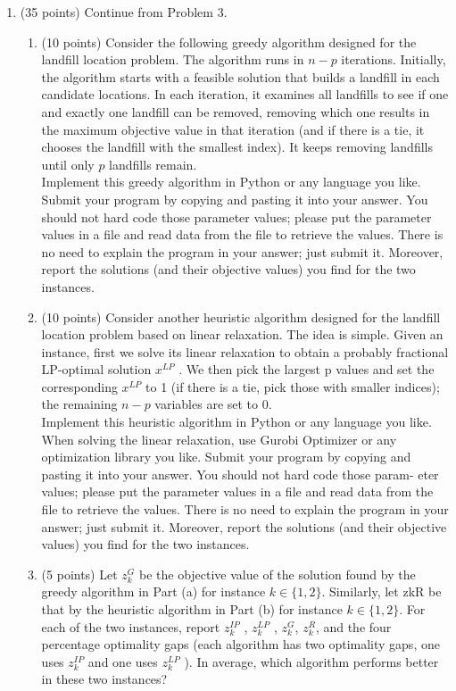 \documentclass[12pt]{article}
\begin{document}
\begin{enumerate}
\begin{enumerate}
            \end{enumerate}
      \item (35 points) Continue from Problem 3.
            \begin{enumerate}
                  \item (10 points) Consider the following greedy algorithm designed for the landfill location problem. The algorithm runs in $n - p$ iterations. Initially, the algorithm starts with a feasible solution that builds a landfill in each candidate locations. In each iteration, it examines all landfills to see if one and exactly one landfill can be removed, removing which one results in the maximum objective value in that iteration (and if there is a tie, it chooses the landfill with the smallest index). It keeps removing landfills until only $p$ landfills remain.\\
                        Implement this greedy algorithm in Python or any language you like. Submit your program by copying and pasting it into your answer. You should not hard code those parameter values; please put the parameter values in a file and read data from the file to retrieve the values. There is no need to explain the program in your answer; just submit it. Moreover, report the solutions (and their objective values) you find for the two instances.
                  \item (10 points) Consider another heuristic algorithm designed for the landfill location problem
                        based on linear relaxation. The idea is simple. Given an instance, first we solve its linear
                        relaxation to obtain a probably fractional LP-optimal solution $x^{LP}$ . We then pick the largest
                        p values and set the corresponding $x^{LP}$ to 1 (if there is a tie, pick those with smaller indices);
                        the remaining $n - p$ variables are set to 0.\\
                        Implement this heuristic algorithm in Python or any language you like. When solving the linear relaxation, use Gurobi Optimizer or any optimization library you like. Submit your program by copying and pasting it into your answer. You should not hard code those param- eter values; please put the parameter values in a file and read data from the file to retrieve the values. There is no need to explain the program in your answer; just submit it. Moreover, report the solutions (and their objective values) you find for the two instances.
                  \item (5 points) Let $z_k^G$ be the objective value of the solution found by the greedy algorithm in Part (a) for instance $k \in \{1,2\}$. Similarly, let zkR be that by the heuristic algorithm in Part (b) for instance $k \in \{1, 2\}$. For each of the two instances, report $z_k^{IP}$ , $z_k^{LP}$ , $z_k^G$, $z_k^R$, and the four percentage optimality gaps (each algorithm has two optimality gaps, one uses $z_k^{IP}$ and one uses $z_k^{LP}$ ). In average, which algorithm performs better in these two instances?

\end{enumerate}
\end{enumerate}
\end{document}

